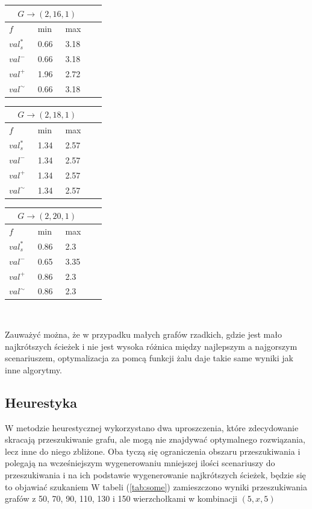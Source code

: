 \documentclass[10pt]{article}
\begin{document}
\begin{center}
  \begin{tabular}{|C{0.08\linewidth}|C{0.08\linewidth}|C{0.08\linewidth}|C{0.08\linewidth}|}
    \hline
     \\ \hline
    $f$          & min  & max  \\ \hline
    $val^*_s$    & 0.66 & 3.18 \\ \hline
    ${val}^-$    & 0.66 & 3.18 \\ \hline
    ${val}^+$    & 1.96 & 2.72 \\ \hline
    ${val}^\sim$ & 0.66 & 3.18 \\ \hline
  \end{tabular}
  \begin{tabular}{|C{0.08\linewidth}|C{0.08\linewidth}|C{0.08\linewidth}|C{0.08\linewidth}|}
    \hline
     \\ \hline
    $f$          & min  & max  \\ \hline
    $val^*_s$    & 1.34 & 2.57 \\ \hline
    ${val}^-$    & 1.34 & 2.57 \\ \hline
    ${val}^+$    & 1.34 & 2.57 \\ \hline
    ${val}^\sim$ & 1.34 & 2.57 \\ \hline
  \end{tabular}
  \begin{tabular}{|C{0.08\linewidth}|C{0.08\linewidth}|C{0.08\linewidth}|C{0.08\linewidth}|}
    \hline
     \\ \hline
    $f$          & min  & max  \\ \hline
    $val^*_s$    & 0.86 & 2.3  \\ \hline
    ${val}^-$    & 0.65 & 3.35 \\ \hline
    ${val}^+$    & 0.86 & 2.3  \\ \hline
    ${val}^\sim$ & 0.86 & 2.3  \\ \hline
  \end{tabular}
  \\\label{tab:all}
\end{center}
Zauważyć można, że w przypadku małych grafów rzadkich, gdzie jest mało najkrótszych ścieżek i nie jest wysoka różnica między najlepszym a najgorszym scenariuszem, optymalizacja za pomcą funkcji żalu daje takie same wyniki jak inne algorytmy.

\subsection{Heurestyka}
W metodzie heurestycznej wykorzystano dwa uproszczenia, które zdecydowanie skracają przeszukiwanie grafu, ale mogą nie znajdywać optymalnego rozwiązania, lecz inne do niego zbliżone. Oba tyczą się ograniczenia obszaru przeszukiwania i polegają na wcześniejszym wygenerowaniu mniejszej ilości scenariuszy do przeszukiwania i na ich podstawie wygenerowanie najkrótszych ścieżek, będzie się to objawiać szukaniem  W tabeli (\ref{tab:some}) zamieszczono wyniki przeszukiwania grafów z 50, 70, 90, 110, 130 i 150 wierzchołkami w kombinacji $(5, x, 5)$
\end{document}
